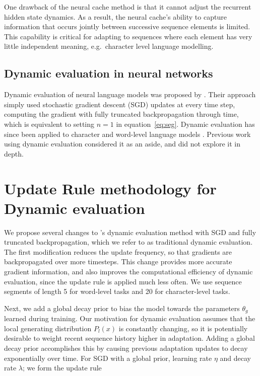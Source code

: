 \documentclass{article} \usepackage{iclr2018_conference,times}
\begin{document}
One drawback of the neural cache method is that it cannot adjust the recurrent hidden state dynamics. As a result, the neural cache's ability to capture information that occurs jointly between successive sequence elements is limited. This capability is critical for adapting to sequences where each element has very little independent meaning, e.g.\ character level language modelling. 


\subsection{Dynamic evaluation in neural networks}

Dynamic evaluation of neural language models was proposed by \citet{mikolov2010}. Their approach simply used stochastic gradient descent (SGD) updates at every time step, computing the gradient with fully truncated backpropagation through time, which is equivalent to setting $n\!=\!1$ in equation~\eqref{eq:seg}. Dynamic evaluation has since been applied to character and word-level language models \citep{Graves-2013,krause2017,ororbia2017,fortunato2017}. Previous work using dynamic evaluation considered it as an aside, and did not explore it in depth.




\section{Update Rule methodology for Dynamic evaluation}
\label{sec:updaterule}


We propose several changes to \citet{mikolov2010}'s dynamic evaluation method with SGD and fully truncated backpropagation, which we refer to as traditional dynamic evaluation. The first modification reduces the update frequency, so that gradients are backpropagated over more timesteps. This change provides more accurate gradient information, and also improves the computational efficiency of dynamic evaluation, since the update rule is applied much less often. We use sequence segments of length 5 for word-level tasks and 20 for character-level tasks. 

Next, we add a global decay prior to bias the model towards the parameters $\theta_g$ learned during training. Our motivation for dynamic evaluation assumes that the local generating distribution $P_l(x)$ is constantly changing, so it is potentially desirable to weight recent sequence history higher in adaptation. Adding a global decay prior accomplishes this by causing previous adaptation updates to decay exponentially over time. For SGD with a global prior, learning rate $\eta$ and decay rate $\lambda$; we form the update rule
\end{document}
